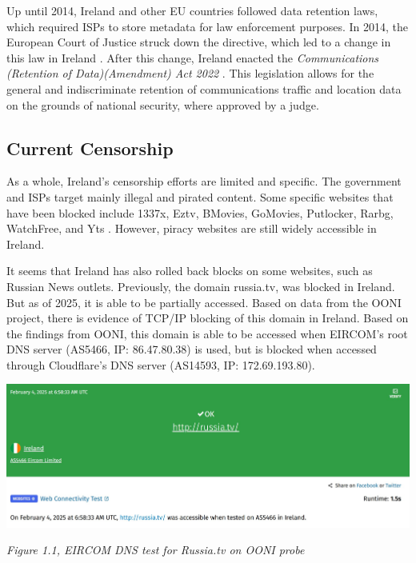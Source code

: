 Up until 2014, Ireland and other EU countries followed data retention laws, which required ISPs to store metadata for law enforcement purposes. In 2014, the European Court of Justice struck down the directive, which led to a change in this law in Ireland \cite{DataRetentionInvalid2014}. After this change, Ireland enacted the \textit{Communications (Retention of Data)(Amendment) Act 2022} \cite{irishlegalDataRetention}. This legislation allows for the general and indiscriminate retention of communications traffic and location data on the grounds of national security, where approved by a judge.

\subsection{Current Censorship}

As a whole, Ireland's censorship efforts are limited and specific. The government and ISPs target mainly illegal and pirated content. Some specific websites that have been blocked include 1337x, Eztv, BMovies, GoMovies, Putlocker, Rarbg, WatchFree, and Yts \cite{siliconrepublicMovieIndustry}. However, piracy websites are still widely accessible in Ireland.

It seems that Ireland has also rolled back blocks on some websites, such as Russian News outlets. Previously, the domain russia.tv, was blocked in Ireland. But as of 2025, it is able to be partially accessed. Based on data from the OONI project, there is evidence of TCP/IP blocking of this domain in Ireland. Based on the findings from OONI, this domain is able to be accessed when EIRCOM's root DNS server (AS5466, IP: 86.47.80.38) is used, but is blocked when accessed through Cloudflare's DNS server (AS14593, IP: 172.69.193.80).

\centerline{\includegraphics[width=480pt]{Griff/Latex/TCD SCSS CAPSTONE/Literature Review/Eircom Access russiatb.jpg}}

\centerline{\textit{Figure 1.1, EIRCOM DNS test for Russia.tv on OONI probe}}

